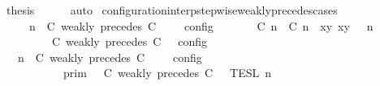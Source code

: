 \begin{isabellebody}
\ {\isacharquery}thesis\isanewline
\ \ \ \ \isamarkupfalse%
\ auto\isanewline
{}\isamarkupfalse%
%
\endisatagproof
{\isafoldproof}%
%
\isadelimproof
\isanewline
%
\endisadelimproof
\isanewline
{}\isamarkupfalse%
\ configuration{\isacharunderscore}interp{\isacharunderscore}stepwise{\isacharunderscore}weakly{\isacharunderscore}precedes{\isacharunderscore}cases{\isacharcolon}\isanewline
\ \ \ {\isacartoucheopen}{\isasymlbrakk}\ {\isasymGamma}{\isacharcomma}\ n\ {\isasymTurnstile}\ {\isacharparenleft}{\isacharparenleft}C\ weakly\ precedes\ C\ {\isacharhash}\ {\isasymPsi}{\isacharparenright}\ {\isasymtriangleright}\ {\isasymPhi}\ {\isasymrbrakk}\isactrlsub c\isactrlsub o\isactrlsub n\isactrlsub f\isactrlsub i\isactrlsub g\isanewline
\ \ \ \ {\isacharequal}\ {\isasymlbrakk}\ {\isacharparenleft}{\isacharparenleft}{\isasymlceil}{\isacharhash}\isactrlsup {\isasymle}\ C\ n{\isacharcomma}\ {\isacharhash}\isactrlsup {\isasymle}\ C\ n{\isasymrceil}\ {\isasymin}\ {\isacharparenleft}{\isasymlambda}{\isacharparenleft}x{\isacharcomma}y{\isacharparenright}{\isachardot}\ x{\isasymle}y{\isacharparenright}{\isacharparenright}\ {\isacharhash}\ {\isasymGamma}{\isacharparenright}{\isacharcomma}\ n\isanewline
\ \ \ \ \ \ {\isasymTurnstile}\ {\isasymPsi}\ {\isasymtriangleright}\ {\isacharparenleft}{\isacharparenleft}C\ weakly\ precedes\ C\ {\isacharhash}\ {\isasymPhi}{\isacharparenright}\ {\isasymrbrakk}\isactrlsub c\isactrlsub o\isactrlsub n\isactrlsub f\isactrlsub i\isactrlsub g{\isacartoucheclose}\isanewline
%
\isadelimproof
%
\endisadelimproof
%
\isatagproof
{}\isamarkupfalse%
\ {\isacharminus}\isanewline
\ \ \isamarkupfalse%
\ {\isacartoucheopen}{\isasymlbrakk}\ {\isasymGamma}{\isacharcomma}\ n\ {\isasymTurnstile}\ {\isacharparenleft}C\ weakly\ precedes\ C\ {\isacharhash}\ {\isasymPsi}\ {\isasymtriangleright}\ {\isasymPhi}\ {\isasymrbrakk}\isactrlsub c\isactrlsub o\isactrlsub n\isactrlsub f\isactrlsub i\isactrlsub g\isanewline
\ \ \ \ \ \ \ \ {\isacharequal}\ {\isasymlbrakk}{\isasymlbrakk}\ {\isasymGamma}\ {\isasymrbrakk}{\isasymrbrakk}\isactrlsub p\isactrlsub r\isactrlsub i\isactrlsub m\ {\isasyminter}\ {\isasymlbrakk}{\isasymlbrakk}\ {\isacharparenleft}C\ weakly\ precedes\ C\ {\isacharhash}\ {\isasymPsi}\ {\isasymrbrakk}{\isasymrbrakk}\isactrlsub T\isactrlsub E\isactrlsub S\isactrlsub L\isactrlbsup {\isasymge}\ n\isactrlesup \isanewline

\end{isabellebody}
